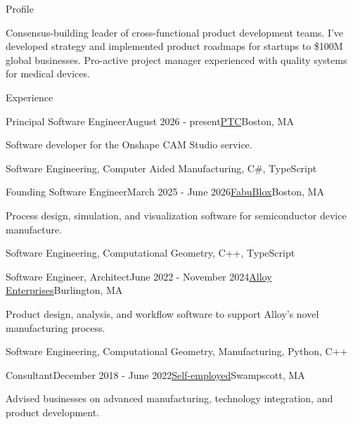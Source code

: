 \documentclass{resume}
\begin{document}
\begin{rSection}{Profile}
\item Consensus-building leader of cross-functional product development teams. I've developed strategy and implemented product roadmaps for startups to \$100M global businesses. Pro-active project manager experienced with quality systems for medical devices.
\end{rSection}

\begin{rSection}{Experience}

\begin{rSubsection}{Principal Software Engineer}{August 2026 - present}{\href{https://ptc.com}{PTC}}{Boston, MA}
\item Software developer for the Onshape CAM Studio service.
\item Software Engineering, Computer Aided Manufacturing, C\#, TypeScript    
\end{rSubsection}

\begin{rSubsection}{Founding Software Engineer}{March 2025 - June 2026}{\href{https://fabublox.com}{FabuBlox}}{Boston, MA}
\item Process design, simulation, and visualization software for semiconductor device manufacture.
\item Software Engineering, Computational Geometry, C++, TypeScript    
\end{rSubsection}
    
\begin{rSubsection}{Software Engineer, Architect}{June 2022 - November 2024}{\href{https://alloyenterprises.co}{Alloy Enterprises}}{Burlington, MA}
\item Product design, analysis, and workflow software to support Alloy's novel manufacturing process.
\item Software Engineering, Computational Geometry, Manufacturing, Python, C++
\end{rSubsection}

\begin{rSubsection}{Consultant}{December 2018 - June 2022}{\href{https://metatooth.com/services}{Self-employed}}{Swampscott, MA}
\item Advised businesses on advanced manufacturing, technology integration, and product development.
\end{rSubsection}


\end{rSection}
\end{document}
